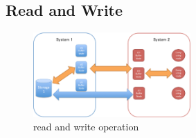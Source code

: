 




\subsection{Read and Write}

\begin{figure}[tb]
	\centering
	\includegraphics[width=6cm]{../img/read_and_write}
	\caption{read and write operation}
	\label{read and write}
\end{figure}

